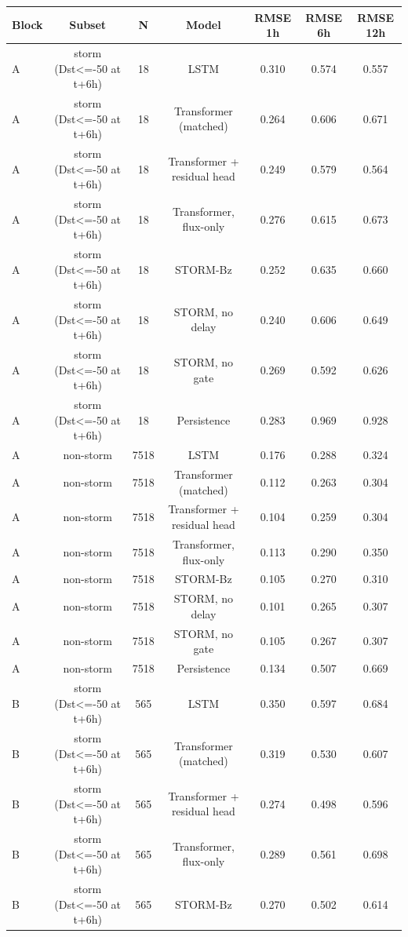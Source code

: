\begin{tabular}{lcccccc}
\toprule
Block & Subset & N & Model & RMSE 1h & RMSE 6h & RMSE 12h \\
\midrule
A & storm (Dst<=-50 at t+6h) & 18 & LSTM & 0.310 & 0.574 & 0.557 \\
A & storm (Dst<=-50 at t+6h) & 18 & Transformer (matched) & 0.264 & 0.606 & 0.671 \\
A & storm (Dst<=-50 at t+6h) & 18 & Transformer + residual head & 0.249 & 0.579 & 0.564 \\
A & storm (Dst<=-50 at t+6h) & 18 & Transformer, flux-only & 0.276 & 0.615 & 0.673 \\
A & storm (Dst<=-50 at t+6h) & 18 & STORM-Bz & 0.252 & 0.635 & 0.660 \\
A & storm (Dst<=-50 at t+6h) & 18 & STORM, no delay & 0.240 & 0.606 & 0.649 \\
A & storm (Dst<=-50 at t+6h) & 18 & STORM, no gate & 0.269 & 0.592 & 0.626 \\
A & storm (Dst<=-50 at t+6h) & 18 & Persistence & 0.283 & 0.969 & 0.928 \\
A & non-storm & 7518 & LSTM & 0.176 & 0.288 & 0.324 \\
A & non-storm & 7518 & Transformer (matched) & 0.112 & 0.263 & 0.304 \\
A & non-storm & 7518 & Transformer + residual head & 0.104 & 0.259 & 0.304 \\
A & non-storm & 7518 & Transformer, flux-only & 0.113 & 0.290 & 0.350 \\
A & non-storm & 7518 & STORM-Bz & 0.105 & 0.270 & 0.310 \\
A & non-storm & 7518 & STORM, no delay & 0.101 & 0.265 & 0.307 \\
A & non-storm & 7518 & STORM, no gate & 0.105 & 0.267 & 0.307 \\
A & non-storm & 7518 & Persistence & 0.134 & 0.507 & 0.669 \\
B & storm (Dst<=-50 at t+6h) & 565 & LSTM & 0.350 & 0.597 & 0.684 \\
B & storm (Dst<=-50 at t+6h) & 565 & Transformer (matched) & 0.319 & 0.530 & 0.607 \\
B & storm (Dst<=-50 at t+6h) & 565 & Transformer + residual head & 0.274 & 0.498 & 0.596 \\
B & storm (Dst<=-50 at t+6h) & 565 & Transformer, flux-only & 0.289 & 0.561 & 0.698 \\
B & storm (Dst<=-50 at t+6h) & 565 & STORM-Bz & 0.270 & 0.502 & 0.614 \\

\end{tabular}
